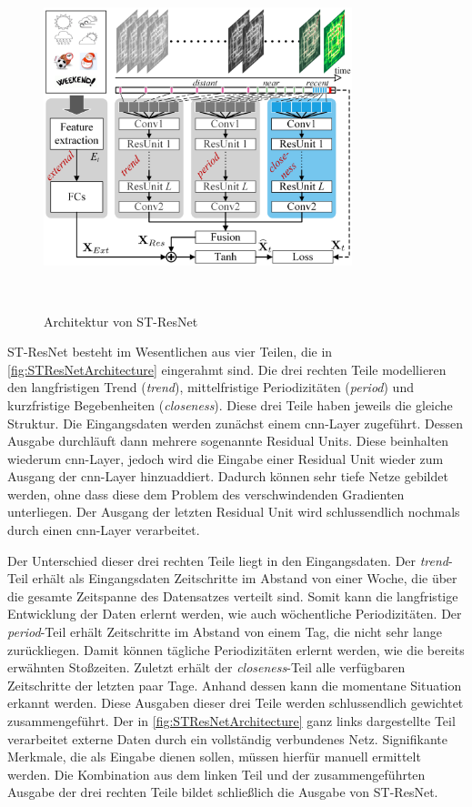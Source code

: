\begin{figure}[h]
    \centering
    \includegraphics[width=0.8\textwidth,height=10cm,keepaspectratio=true]{content/images/STResNetArchitecture.png}
    \caption{Architektur von ST-ResNet \cite[Figure 3]{STResNetOriginal}}
    \label{fig:STResNetArchitecture}
\end{figure}

ST-ResNet besteht im Wesentlichen aus vier Teilen, die in \autoref{fig:STResNetArchitecture} eingerahmt sind.
Die drei rechten Teile modellieren den langfristigen Trend (\emph{trend}), mittelfristige Periodizitäten (\emph{period}) und kurzfristige Begebenheiten (\emph{closeness}).
Diese drei Teile haben jeweils die gleiche Struktur.
Die Eingangsdaten werden zunächst einem \acrshort{cnn}-Layer zugeführt.
Dessen Ausgabe durchläuft dann mehrere sogenannte Residual Units.
Diese beinhalten wiederum \acrshort{cnn}-Layer, jedoch wird die Eingabe einer Residual Unit wieder zum Ausgang der \acrshort{cnn}-Layer hinzuaddiert.
Dadurch können sehr tiefe Netze gebildet werden, ohne dass diese dem Problem des verschwindenden Gradienten unterliegen.
Der Ausgang der letzten Residual Unit wird schlussendlich nochmals durch einen \acrshort{cnn}-Layer verarbeitet.

Der Unterschied dieser drei rechten Teile liegt in den Eingangsdaten.
Der \emph{trend}-Teil erhält als Eingangsdaten Zeitschritte im Abstand von einer Woche, die über die gesamte Zeitspanne des Datensatzes verteilt sind.
Somit kann die langfristige Entwicklung der Daten erlernt werden, wie auch wöchentliche Periodizitäten.
Der \emph{period}-Teil erhält Zeitschritte im Abstand von einem Tag, die nicht sehr lange zurückliegen.
Damit können tägliche Periodizitäten erlernt werden, wie die bereits erwähnten Stoßzeiten.
Zuletzt erhält der \emph{closeness}-Teil alle verfügbaren Zeitschritte der letzten paar Tage.
Anhand dessen kann die momentane Situation erkannt werden.
Diese Ausgaben dieser drei Teile werden schlussendlich gewichtet zusammengeführt.
Der in \autoref{fig:STResNetArchitecture} ganz links dargestellte Teil verarbeitet externe Daten durch ein vollständig verbundenes Netz.
Signifikante Merkmale, die als Eingabe dienen sollen, müssen hierfür manuell ermittelt werden.
Die Kombination aus dem linken Teil und der zusammengeführten Ausgabe der drei rechten Teile bildet schließlich die Ausgabe von ST-ResNet.

